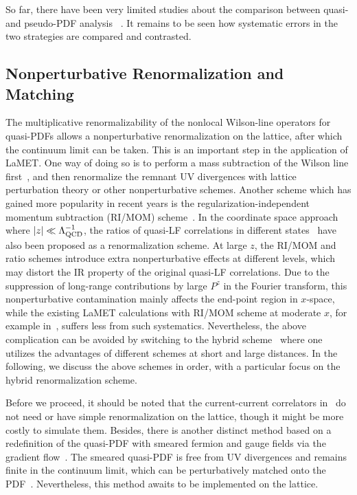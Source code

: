 So far, there have been very limited studies about the comparison between quasi- and pseudo-PDF analysis
~\cite{Bhat:2020ktg,Alexandrou:2020qtt}. It remains to be seen how systematic errors
in the two strategies are compared and contrasted.

\subsection{Nonperturbative Renormalization and Matching}
\label{sec:renorm-npr}
The multiplicative renormalizability of the nonlocal Wilson-line operators for quasi-PDFs allows a nonperturbative renormalization on the lattice, after which the continuum limit can be taken.
This is an important step in the application of LaMET.
One way of doing so is to perform a mass
subtraction of the Wilson line first~\cite{Musch:2010ka,Ishikawa:2016znu,Chen:2016fxx,Zhang:2017bzy,Green:2017xeu,Green:2020xco}, and then renormalize the remnant UV divergences with lattice perturbation theory or other nonperturbative schemes. Another scheme which has gained more popularity in recent years is the regularization-independent momentum subtraction (RI/MOM) scheme~\cite{Constantinou:2017sej,Stewart:2017tvs,Alexandrou:2017huk,Chen:2017mzz,Liu:2018uuj}.
In the coordinate space approach where $|z|\ll \Lambda_{\rm QCD}^{-1}$, the ratios of quasi-LF correlations in
different states~\cite{Radyushkin:2017cyf,Orginos:2017kos,Braun:2018brg,Li:2020xml} have also been proposed as a renormalization scheme. At large $z$, the RI/MOM and ratio schemes introduce extra nonperturbative effects at different levels, which may distort the IR property of the original quasi-LF correlations. Due to the suppression  of long-range contributions by large $P^z$ in the Fourier transform, this nonperturbative contamination mainly affects the end-point region in $x$-space, while the existing LaMET calculations with RI/MOM scheme at moderate $x$, for example in~\cite{Alexandrou:2018eet,Lin:2018qky}, suffers less from such systematics. Nevertheless, the above complication can be avoided by switching to the hybrid scheme~\cite{Ji:2020brr} where one utilizes the advantages of different schemes at short and large distances.
In the following, we discuss the above schemes in order, with a particular focus on the hybrid renormalization scheme.


Before we proceed, it should be noted that the current-current correlators in~\cite{Detmold:2005gg,Braun:2007wv,Ma:2017pxb} do not need or have simple renormalization on the lattice, though it might be more costly to simulate them. Besides, there is another distinct method based on a redefinition of the quasi-PDF with smeared fermion and gauge fields via the gradient flow~\cite{Monahan:2016bvm}. The smeared quasi-PDF is free from UV divergences and remains finite in the continuum limit, which can be perturbatively matched onto the PDF~\cite{Monahan:2017hpu}. Nevertheless, this method awaits to be implemented on the lattice.

